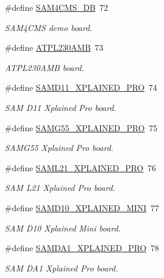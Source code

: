 \begin{DoxyCompactItemize}
\#define \mbox{\hyperlink{group__group__common__boards_ga96e76e141153f52917d300eb4e345453}{S\+A\+M4\+C\+M\+S\+\_\+\+DB}}~72
\begin{DoxyCompactList}\small\item\em S\+A\+M4\+C\+MS demo board. \end{DoxyCompactList}\item 
\#define \mbox{\hyperlink{group__group__common__boards_gae302bf61ade17e24b9b7a5c77facfaad}{A\+T\+P\+L230\+A\+MB}}~73
\begin{DoxyCompactList}\small\item\em A\+T\+P\+L230\+A\+MB board. \end{DoxyCompactList}\item 
\#define \mbox{\hyperlink{group__group__common__boards_ga9da8619e643b6cb73275805e65015201}{S\+A\+M\+D11\+\_\+\+X\+P\+L\+A\+I\+N\+E\+D\+\_\+\+P\+RO}}~74
\begin{DoxyCompactList}\small\item\em S\+AM D11 Xplained Pro board. \end{DoxyCompactList}\item 
\#define \mbox{\hyperlink{group__group__common__boards_gaa50c07128a9572f0294b00e09779bc9a}{S\+A\+M\+G55\+\_\+\+X\+P\+L\+A\+I\+N\+E\+D\+\_\+\+P\+RO}}~75
\begin{DoxyCompactList}\small\item\em S\+A\+M\+G55 Xplained Pro board. \end{DoxyCompactList}\item 
\#define \mbox{\hyperlink{group__group__common__boards_ga52dce8a8284c4dc5338eeed440b180f6}{S\+A\+M\+L21\+\_\+\+X\+P\+L\+A\+I\+N\+E\+D\+\_\+\+P\+RO}}~76
\begin{DoxyCompactList}\small\item\em S\+AM L21 Xplained Pro board. \end{DoxyCompactList}\item 
\#define \mbox{\hyperlink{group__group__common__boards_gabd7ecd8c599ea712f27d7a8b218b9e71}{S\+A\+M\+D10\+\_\+\+X\+P\+L\+A\+I\+N\+E\+D\+\_\+\+M\+I\+NI}}~77
\begin{DoxyCompactList}\small\item\em S\+AM D10 Xplained Mini board. \end{DoxyCompactList}\item 
\#define \mbox{\hyperlink{group__group__common__boards_ga303331f4d0c592b45e2992cf0117b2ca}{S\+A\+M\+D\+A1\+\_\+\+X\+P\+L\+A\+I\+N\+E\+D\+\_\+\+P\+RO}}~78
\begin{DoxyCompactList}\small\item\em S\+AM D\+A1 Xplained Pro board. \end{DoxyCompactList}\item 

\end{DoxyCompactItemize}
